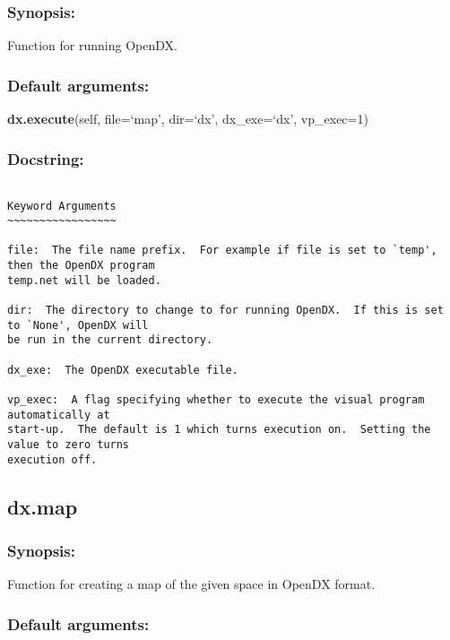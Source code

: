 \subsubsection{Synopsis:}

Function for running OpenDX.

\subsubsection{Default arguments:}

\textsf{\textbf{dx.execute}(self, file=`map', dir=`dx', dx\_exe=`dx', vp\_exec=1)
}


\subsubsection{Docstring:}

{\scriptsize
\begin{verbatim}

Keyword Arguments
~~~~~~~~~~~~~~~~~

file:  The file name prefix.  For example if file is set to `temp', then the OpenDX program
temp.net will be loaded.

dir:  The directory to change to for running OpenDX.  If this is set to `None', OpenDX will
be run in the current directory.

dx_exe:  The OpenDX executable file.

vp_exec:  A flag specifying whether to execute the visual program automatically at
start-up.  The default is 1 which turns execution on.  Setting the value to zero turns
execution off.
\end{verbatim}
}



\newpage

\subsection{dx.map}


\subsubsection{Synopsis:}

Function for creating a map of the given space in OpenDX format.

\subsubsection{Default arguments:}

